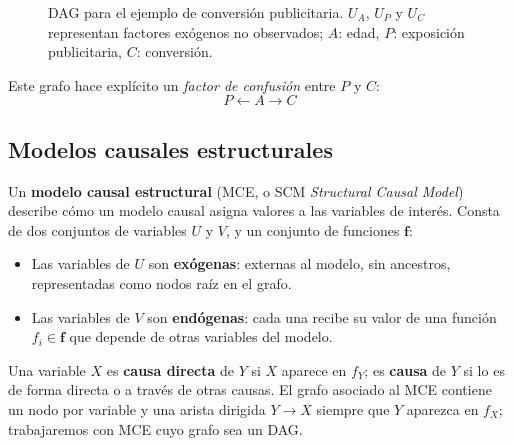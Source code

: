 \documentclass[12pt]{report} %
\begin{document}
\begin{figure}[H]
    \centering
    \begingroup
    \shorthandoff{<>}
    \endgroup
    \caption[DAG de conversión publicitaria]{DAG para el ejemplo de conversión publicitaria. $U_A$, $U_P$ y $U_C$ representan factores exógenos no observados; $A$: edad, $P$: exposición publicitaria, $C$: conversión.}
    \label{fig:dag_conversion_publicidad}
\end{figure}

Este grafo hace explícito un \textit{factor de confusión} entre $P$ y $C$:
$$
    P \leftarrow A \rightarrow C
$$

\subsection{Modelos causales estructurales}

Un \textbf{modelo causal estructural} (MCE, o SCM \textit{Structural Causal Model}) describe cómo un modelo causal asigna valores a las variables de interés. Consta de dos conjuntos de variables $U$ y $V$, y un conjunto de funciones $\mathbf{f}$:
\begin{itemize}
    \item Las variables de $U$ son \textbf{exógenas}: externas al modelo, sin ancestros, representadas como nodos raíz en el grafo.
    \item Las variables de $V$ son \textbf{endógenas}: cada una recibe su valor de una función $f_i \in \mathbf{f}$ que depende de otras variables del modelo.
\end{itemize}

Una variable $X$ es \textbf{causa directa} de $Y$ si $X$ aparece en $f_Y$; es \textbf{causa} de $Y$ si lo es de forma directa o a través de otras causas. El grafo asociado al MCE contiene un nodo por variable y una arista dirigida $Y \to X$ siempre que $Y$ aparezca en $f_X$; trabajaremos con MCE cuyo grafo sea un DAG.
\end{document}

